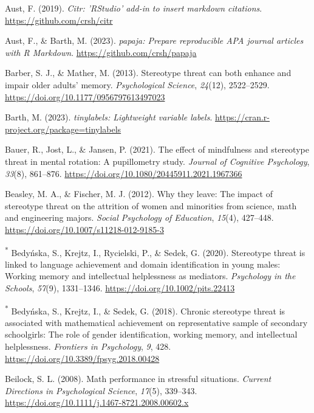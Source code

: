 \documentclass[
  stu, a4paper,floatsintext]{apa7}
\newlength{\cslhangindent}
\newenvironment{CSLReferences}[2] %
 {\begin{list}{}{%
  \setlength{\itemindent}{0pt}
  \setlength{\leftmargin}{0pt}
  \setlength{\parsep}{0pt}
  \ifodd #1
   \setlength{\leftmargin}{\cslhangindent}
   \setlength{\itemindent}{-1\cslhangindent}
  \fi
  \setlength{\itemsep}{#2\baselineskip}}}
 {\end{list}}
\begin{document}
\begin{CSLReferences}{1}{0}
Aust, F. (2019). \emph{Citr: 'RStudio' add-in to insert markdown citations}. \url{https://github.com/crsh/citr}

Aust, F., \& Barth, M. (2023). \emph{{papaja}: {Prepare} reproducible {APA} journal articles with {R Markdown}}. \url{https://github.com/crsh/papaja}

Barber, S. J., \& Mather, M. (2013). Stereotype threat can both enhance and impair older adults' memory. \emph{Psychological Science}, \emph{24}(12), 2522--2529. \url{https://doi.org/10.1177/0956797613497023}

Barth, M. (2023). \emph{{tinylabels}: Lightweight variable labels}. \url{https://cran.r-project.org/package=tinylabels}

Bauer, R., Jost, L., \& Jansen, P. (2021). The effect of mindfulness and stereotype threat in mental rotation: A pupillometry study. \emph{Journal of Cognitive Psychology}, \emph{33}(8), 861--876. \url{https://doi.org/10.1080/20445911.2021.1967366}

Beasley, M. A., \& Fischer, M. J. (2012). Why they leave: The impact of stereotype threat on the attrition of women and minorities from science, math and engineering majors. \emph{Social Psychology of Education}, \emph{15}(4), 427--448. \url{https://doi.org/10.1007/s11218-012-9185-3}

\textsuperscript{*} Bedyńska, S., Krejtz, I., Rycielski, P., \& Sedek, G. (2020). Stereotype threat is linked to language achievement and domain identification in young males: {Working} memory and intellectual helplessness as mediators. \emph{Psychology in the Schools}, \emph{57}(9), 1331--1346. \url{https://doi.org/10.1002/pits.22413}

\textsuperscript{*} Bedyńska, S., Krejtz, I., \& Sedek, G. (2018). Chronic stereotype threat is associated with mathematical achievement on representative sample of secondary schoolgirls: {The} role of gender identification, working memory, and intellectual helplessness. \emph{Frontiers in Psychology}, \emph{9}, 428. \url{https://doi.org/10.3389/fpsyg.2018.00428}

Beilock, S. L. (2008). Math performance in stressful situations. \emph{Current Directions in Psychological Science}, \emph{17}(5), 339--343. \url{https://doi.org/10.1111/j.1467-8721.2008.00602.x}


\end{CSLReferences}
\end{document}
